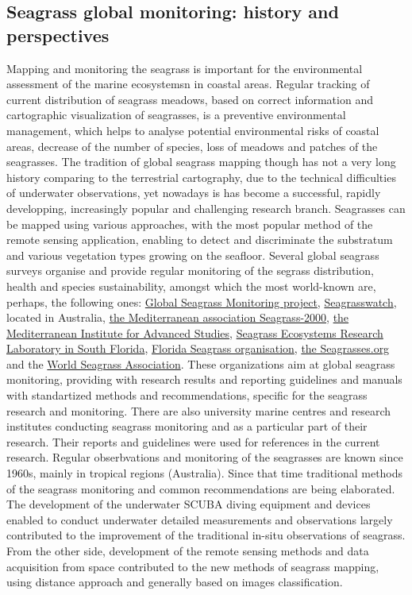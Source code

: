\documentclass[10pt, a4paper]{article}
\begin{document}
\subsection{Seagrass global monitoring: history and perspectives}
Mapping and monitoring the seagrass is important for the environmental assessment of the marine
ecosystemsn in coastal areas. Regular tracking of current distribution of seagrass meadows, based on
correct information and cartographic visualization of seagrasses, is a preventive environmental
management, which helps to analyse potential environmental risks of coastal areas, decrease of the
number of species, loss of meadows and patches of the seagrasses.
The tradition of global seagrass mapping though has not a very long history comparing to the
terrestrial cartography, due to the technical difficulties of underwater observations, yet nowadays is
has become a successful, rapidly developping, increasingly popular and challenging research branch.
Seagrasses can be mapped using various approaches, with the most popular method of the remote
sensing application, enabling to detect and discriminate the substratum and various vegetation types
growing on the seafloor.
Several global seagrass surveys organise and provide regular monitoring of the segrass distribution,
health and species sustainability, amongst which the most world-known are, perhaps, the following
ones: \href{http://www.seagrassnet.org/}{Global Seagrass Monitoring project}, \href{http://www.seagrasswatch.org/}{Seagrasswatch}, 
located in Australia, \href{http://mediterranean.seagrassonline.org/}{the Mediterranean association Seagrass-2000},
\href{http://www.imedea.uib.es/index.php}{the Mediterranean Institute for Advanced Studies},
\href{http://www2.fiu.edu/~seagrass/}{Seagrass Ecosystems Research Laboratory in South Florida},
\href{http://www.flseagrass.org/}{Florida Seagrass organisation}, \href{http://www.seagrasses.org/}{the Seagrasses.org} and the 
\href{http://wsa.seagrassonline.org/}{World Seagrass Association}.
 These organizations aim at global seagrass monitoring, providing with
research results and reporting guidelines and manuals with standartized methods and
recommendations, specific for the seagrass research and monitoring. There are also university marine
centres and research institutes conducting seagrass monitoring and as a particular part of their
research. Their reports and guidelines were used for references in the current research.
Regular obserbvations and monitoring of the seagrasses are known since 1960s, mainly in tropical
regions (Australia). Since that time traditional methods of the seagrass monitoring and common
recommendations are being elaborated. The development of the underwater SCUBA diving
equipment and devices enabled to conduct underwater detailed measurements and observations
largely contributed to the improvement of the traditional in-situ observations of seagrass. From the
other side, development of the remote sensing methods and data acquisition from space contributed to
the new methods of seagrass mapping, using distance approach and generally based on images
classification.
\end{document}
